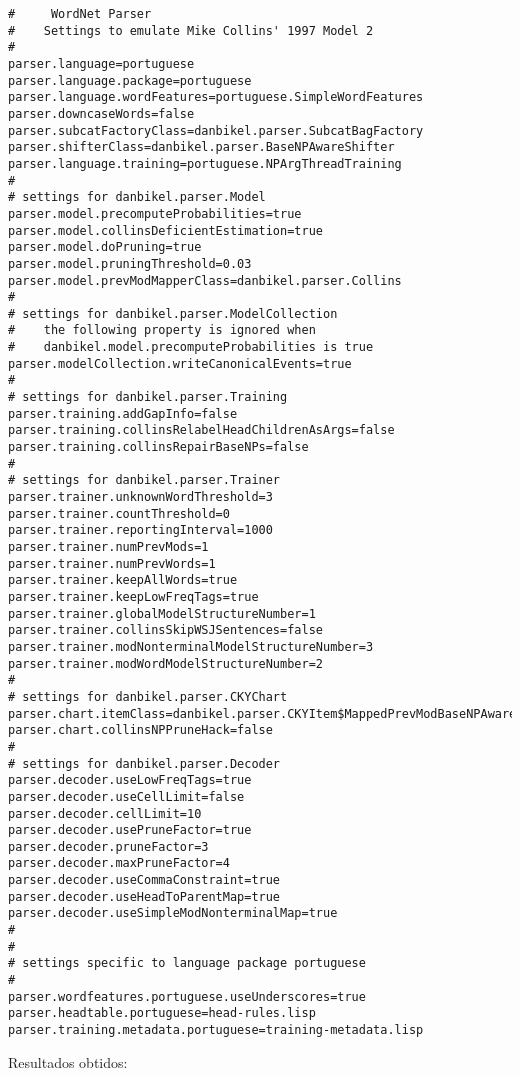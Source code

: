 \scriptsize
\begin{verbatim}
#     WordNet Parser
#    Settings to emulate Mike Collins' 1997 Model 2
#
parser.language=portuguese
parser.language.package=portuguese
parser.language.wordFeatures=portuguese.SimpleWordFeatures
parser.downcaseWords=false
parser.subcatFactoryClass=danbikel.parser.SubcatBagFactory
parser.shifterClass=danbikel.parser.BaseNPAwareShifter
parser.language.training=portuguese.NPArgThreadTraining
#
# settings for danbikel.parser.Model
parser.model.precomputeProbabilities=true
parser.model.collinsDeficientEstimation=true
parser.model.doPruning=true
parser.model.pruningThreshold=0.03
parser.model.prevModMapperClass=danbikel.parser.Collins
#
# settings for danbikel.parser.ModelCollection
#    the following property is ignored when
#    danbikel.model.precomputeProbabilities is true
parser.modelCollection.writeCanonicalEvents=true
#
# settings for danbikel.parser.Training
parser.training.addGapInfo=false
parser.training.collinsRelabelHeadChildrenAsArgs=false
parser.training.collinsRepairBaseNPs=false
#
# settings for danbikel.parser.Trainer
parser.trainer.unknownWordThreshold=3
parser.trainer.countThreshold=0
parser.trainer.reportingInterval=1000
parser.trainer.numPrevMods=1
parser.trainer.numPrevWords=1
parser.trainer.keepAllWords=true
parser.trainer.keepLowFreqTags=true
parser.trainer.globalModelStructureNumber=1
parser.trainer.collinsSkipWSJSentences=false
parser.trainer.modNonterminalModelStructureNumber=3
parser.trainer.modWordModelStructureNumber=2
#
# settings for danbikel.parser.CKYChart
parser.chart.itemClass=danbikel.parser.CKYItem$MappedPrevModBaseNPAware
parser.chart.collinsNPPruneHack=false
#
# settings for danbikel.parser.Decoder
parser.decoder.useLowFreqTags=true
parser.decoder.useCellLimit=false
parser.decoder.cellLimit=10
parser.decoder.usePruneFactor=true
parser.decoder.pruneFactor=3
parser.decoder.maxPruneFactor=4
parser.decoder.useCommaConstraint=true
parser.decoder.useHeadToParentMap=true
parser.decoder.useSimpleModNonterminalMap=true
#
#
# settings specific to language package portuguese
#
parser.wordfeatures.portuguese.useUnderscores=true
parser.headtable.portuguese=head-rules.lisp
parser.training.metadata.portuguese=training-metadata.lisp

\end{verbatim}

\normalsize

Resultados obtidos:


